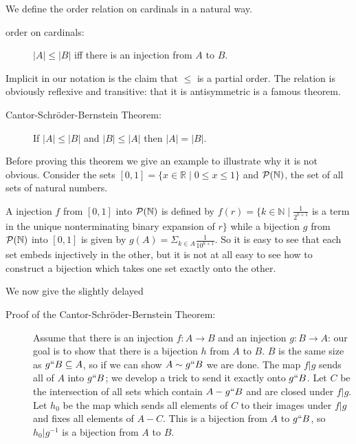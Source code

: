 \documentclass[12pt]{book}
\begin{document}
We define the order relation on cardinals in a natural way.

\begin{description}

\item[order on cardinals:] $|A| \leq |B|$ iff there is an injection from
$A$ to $B$.

\end{description}

Implicit in our notation is the claim that $\leq$ is a partial order.
The relation is obviously reflexive and transitive: that it is
antisymmetric is a famous theorem.

\begin{description}

\item[Cantor-Schr\"oder-Bernstein Theorem:] If $|A| \leq |B|$ and $|B|
\leq |A|$ then $|A|=|B|$.

\end{description}

Before proving this theorem we give an example to illustrate why it is
not obvious.  Consider the sets $[0,1] = \{x \in {\mathbb R} \mid 0
\leq x \leq 1\}$ and ${\cal P}({\mathbb N})$, the set of all sets of
natural numbers.

A injection $f$ from $[0,1]$ into ${\cal P}({\mathbb N})$ is defined
by $f(r) = \{k \in {\mathbb N}\mid \frac1{2^{k+1}}$ is a term in the
unique nonterminating binary expansion of $r\}$ while a bijection $g$
from ${\cal P}({\mathbb N})$ into $[0,1]$ is given by $g(A) =
\Sigma_{k\in A}\frac1{10^{k+1}}$.  So it is easy to see that each set
embeds injectively in the other, but it is not at all easy to see how
to construct a bijection which takes one set exactly onto the other.

We now give the slightly delayed


\begin{description}

\item[Proof of the Cantor-Schr\"oder-Bernstein Theorem:] Assume that there
is an injection $f:A \rightarrow B$ and an injection $g:B \rightarrow
A$: our goal is to show that there is a bijection $h$ from $A$ to $B$.
$B$ is the same size as $g``B \subseteq A$, so if we can show $A \sim
g``B$ we are done.  The map $f|g$ sends all of $A$ into $g``B$; we
develop a trick to send it exactly onto $g``B$.  Let $C$ be the
intersection of all sets which contain $A-g``B$ and are closed under
$f|g$.  Let $h_0$ be the map which sends all elements of $C$ to their
images under $f|g$ and fixes all elements of $A-C$.  This is a
bijection from $A$ to $g``B$, so $h_0|g^{-1}$ is a bijection from $A$
to $B$.

\end{description}
\end{document}
